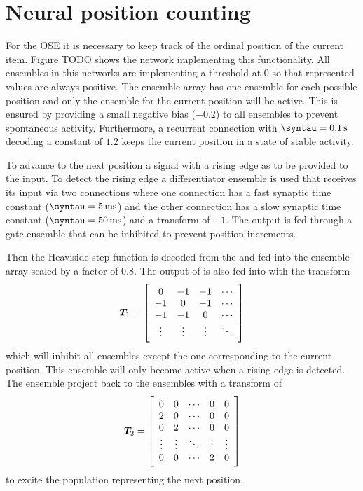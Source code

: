 \section{Neural position counting}
For the OSE it is necessary to keep track of the ordinal position of the current item.
Figure TODO shows the network implementing this functionality.
All ensembles in this networks are implementing a threshold at 0 so that represented values are always positive.
The  ensemble array has one ensemble for each possible position and only the ensemble for the current position will be active.
This is ensured by providing a small negative bias ($-0.2$) to all ensembles to prevent spontaneous activity.
Furthermore, a recurrent connection with $\syntau = \SI{0.1}{\second}$ decoding a constant of $1.2$ keeps the current position in a state of stable activity.

To advance to the next position a signal with a rising edge as to be provided to the  input.
To detect the rising edge a differentiator ensemble is used that receives its input via two connections where one connection has a fast synaptic time constant ($\syntau = \SI{5}{\milli\second}$) and the other connection has a slow synaptic time constant ($\syntau = \SI{50}{\milli\second}$) and a transform of $-1$.
The output is fed through a gate ensemble that can be inhibited to prevent position increments.

Then the Heaviside step function is decoded from the  and fed into the  ensemble array scaled by a factor of \num{0.8}.
The output of  is also fed into  with the transform
\begin{equation}
    \mat T_1 = \sbr{\begin{array}{cccc}
        0 & -1 & -1 & \cdots \\
        -1 & 0 & -1 & \cdots \\
        -1 & -1 & 0 & \cdots \\
        \vdots & \vdots & \vdots & \ddots
    \end{array}}
\end{equation}
which will inhibit all ensembles except the one corresponding to the current position.
This ensemble will only become active when a rising edge is detected.
The  ensemble project back to the  ensembles with a transform of
\begin{equation}
    \mat T_2 = \sbr{\begin{array}{ccccc}
        0 & 0 & \cdots & 0 & 0 \\
        2 & 0 & \cdots & 0 & 0 \\
        0 & 2 & \cdots & 0 & 0 \\
        \vdots & \vdots & \ddots & \vdots & \vdots \\
        0 & 0 & \cdots & 2 & 0
    \end{array}}
\end{equation}
to excite the population representing the next position.

